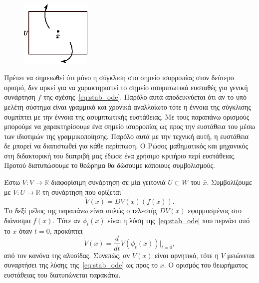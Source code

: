 \begin{figure}[h!]
    \centering
    \includegraphics[width=0.3\textwidth]{figures/stab_unstable.eps}
    \label{fig:stab_unstable}
\end{figure}

Πρέπει να σημειωθεί ότι μόνο η σύγκλιση στο σημείο ισορροπίας στον δεύτερο
ορισμό, δεν αρκεί για να χαρακτηριστεί το σημείο ασυμπτωτικά ευσταθές για
γενική συνάρτηση \( f \) της σχέσης~\eqref{eq:stab_ode}. Παρόλο αυτά
αποδεικνύεται ότι αν το υπό μελέτη σύστημα είναι γραμμικό και χρονικά αναλλοίωτο
τότε η έννοια της σύγκλισης συμπίπτει με την έννοια της ασυμπτωτικής ευστάθειας.
Με τους παραπάνω ορισμούς μπορούμε να χαρακτηρίσουμε ένα σημείο ισορροπίας ως
προς την ευστάθεια του μέσω των ιδιοτιμών της γραμμικοποίησης. Παρόλο αυτά με
την τεχνική αυτή, η ευστάθεια δε μπορεί να διαπιστωθεί για κάθε περίπτωση. Ο
Ρώσος μαθηματικός και μηχανικός  στη διδακτορική του διατριβή μας
έδωσε ένα χρήσιμο κριτήριο περί ευστάθειας. Προτού διατυπώσουμε το θεώρημα θα
δώσουμε κάποιους συμβολισμούς.

Έστω \( V: V \to \mathbb{R} \) διαφορίσιμη συνάρτηση σε μία γειτονιά \( U
\subset W \) του \( \bar{x} \). Συμβολίζουμε με \( \dot{V}: U \to \mathbb{R} \)
τη συνάρτηση που ορίζεται
\[
    \dot{V}(x) = DV(x)(f(x)).
\]
Το δεξί μέλος της παραπάνω είναι απλώς ο τελεστής \( DV(x) \) εφαρμοσμένος στο
διάνυσμα \( f(x) \). Τότε αν \( \phi_t(x) \) είναι η λύση
της~\eqref{eq:stab_ode} που περνάει από το \( x \) όταν \( t = 0 \), προκύπτει
\[
    \dot{V}(x) = \frac{d}{dt}V(\phi_t(x))\big\rvert_{t = 0},
\]
από τον κανόνα της αλυσίδας. Συνεπώς, αν \( \dot{V}(x) \) είναι αρνητικό, τότε η
\( V \) μειώνεται συναρτήσει της λύσης της~\eqref{eq:stab_ode} ως προς το \( x
\). Ο ορισμός του θεωρήματος ευστάθειας του  διατυπώνεται
παρακάτω.

